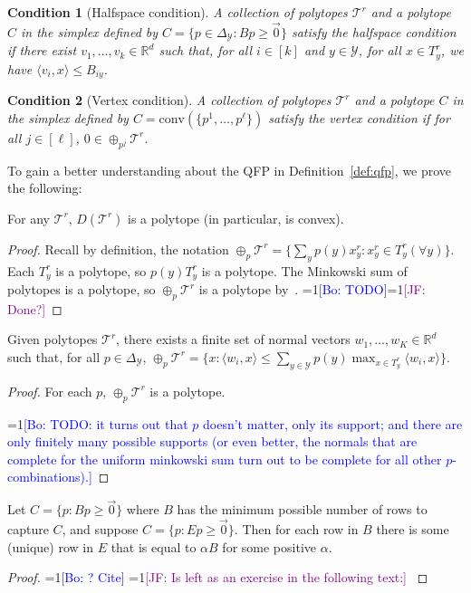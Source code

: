 \documentclass[anon]{colt2020} %
\newcommand{\Comments}{1}
\newcommand{\mynote}[2]{\ifnum\Comments=1\textcolor{#1}{#2}\fi}
\newcommand{\jessie}[1]{\mynote{purple}{[JF: #1]}}
\newcommand{\bo}[1]{\mynote{blue}{[Bo: #1]}}
\newcommand{\reals}{\mathbb{R}}
\newcommand{\simplex}{\Delta_\Y}
\newcommand{\T}{\mathcal{T}}
\newcommand{\Y}{\mathcal{Y}}
\newcommand{\inprod}[2]{\langle #1, #2 \rangle}%
\newcommand{\conv}{\mathrm{conv}}
\newtheorem{condition}{Condition}
\begin{document}
\begin{condition}[Halfspace condition]\label{cond:H-condition}
	A collection of polytopes $\T^r$ and a polytope $C$ in the simplex defined by $C = \{p \in \simplex : Bp \geq \vec 0\}$ \emph{satisfy the halfspace condition} if there exist $v_1, \ldots, v_k \in \reals^d$ such that, for all $i \in [k]$ and $y \in \Y$, for all $x \in T^r_y$, we have $\inprod{v_i}{x} \leq B_{iy}$.
\end{condition}
\begin{condition}[Vertex condition]\label{cond:V-condition}
	A collection of polytopes $\T^r$ and a polytope $C$ in the simplex defined by $C = \conv(\{p^1, \ldots, p^\ell\})$ \emph{satisfy the vertex condition} if for all $j \in [\ell]$, $0 \in \oplus_{p^j} \T^r$. %
\end{condition}

To gain a better understanding about the QFP in Definition~\ref{def:qfp}, we prove the following:
\begin{lemma} \label{lemma:D-polytope}
  For any $\T^r$, $D(\T^r)$ is a polytope (in particular, is convex).
\end{lemma}
\begin{proof}
   Recall by definition, the notation $\oplus_p \T^r = \{\sum_y p(y) x^r_y : x^r_y \in T^r_y (\forall y)\}$.
   Each $T^r_y$ is a polytope, so $p(y) T^r_y$ is a polytope.
   The Minkowski sum of polytopes is a polytope, so $\oplus_p \T^r$ is a polytope by~\cite[Section 1.2]{weibel2007minkowski}.
  \bo{TODO}\jessie{Done?}
\end{proof}
\begin{lemma}  \label{lemma:minkowski-support}
  Given polytopes $\T^r$, there exists a finite set of normal vectors $w_1,\ldots,w_K \in \reals^d$ such that, for all $p \in \simplex$, $\oplus_p \T^r = \{x : \inprod{w_i}{x} \leq \sum_{y \in \Y} p(y) \max_{x \in T^r_y} \inprod{w_i}{x} \}$.
\end{lemma}
\begin{proof}
   For each $p$, $\oplus_p \T^r$ is a polytope.

  \bo{TODO: it turns out that $p$ doesn't matter, only its support; and there are only finitely many possible supports (or even better, the normals that are complete for the uniform minkowski sum turn out to be complete for all other $p$-combinations).}
\end{proof}
\begin{lemma} \label{lemma:E-to-B}
  Let $C = \{p : Bp \geq \vec 0 \}$ where $B$ has the minimum possible number of rows to capture $C$, and suppose $C = \{p : Ep \geq \vec 0 \}$.
  Then for each row in $B$ there is some (unique) row in $E$ that is equal to $\alpha B$ for some positive $\alpha$.
\end{lemma}
\begin{proof}
  \bo{? Cite} \jessie{Is left as an exercise in the following text:} \cite[Exercise 2.15]{ziegler2012lectures}
\end{proof}
\end{document}
